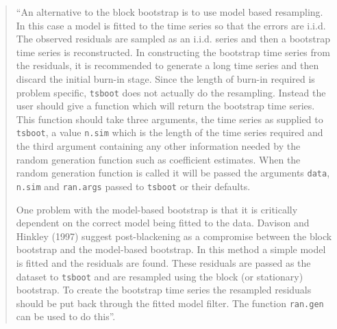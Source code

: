 \documentclass[]{book}
\theoremstyle{break}
\theoremstyle{definition}
\theoremstyle{definition}
\theoremstyle{definition}
\theoremstyle{remark}
\begin{document}
\begin{quote}
``An alternative to the block bootstrap is to use model based
resampling. In this case a model is fitted to the time series so that
the errors are i.i.d. The observed residuals are sampled as an i.i.d.
series and then a bootstrap time series is reconstructed. In
constructing the bootstrap time series from the residuals, it is
recommended to generate a long time series and then discard the initial
burn-in stage. Since the length of burn-in required is problem specific,
\texttt{tsboot} does not actually do the resampling. Instead the user
should give a function which will return the bootstrap time series. This
function should take three arguments, the time series as supplied to
\texttt{tsboot}, a value \texttt{n.sim} which is the length of the time
series required and the third argument containing any other information
needed by the random generation function such as coefficient estimates.
When the random generation function is called it will be passed the
arguments \texttt{data}, \texttt{n.sim} and \texttt{ran.args} passed to
\texttt{tsboot} or their defaults.

One problem with the model-based bootstrap is that it is critically
dependent on the correct model being fitted to the data. Davison and
Hinkley (1997) suggest post-blackening as a compromise between the block
bootstrap and the model-based bootstrap. In this method a simple model
is fitted and the residuals are found. These residuals are passed as the
dataset to \texttt{tsboot} and are resampled using the block (or
stationary) bootstrap. To create the bootstrap time series the resampled
residuals should be put back through the fitted model filter. The
function \texttt{ran.gen} can be used to do this''.
\end{quote}
\end{document}

